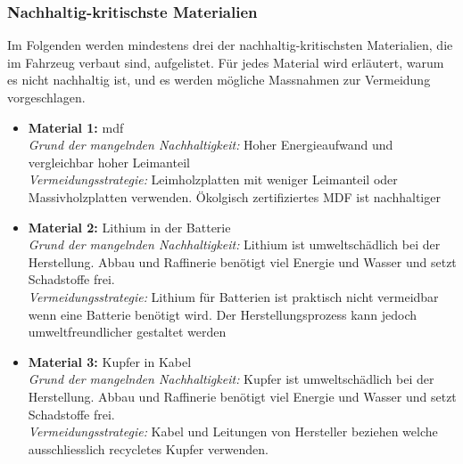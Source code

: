 \subsubsection{Nachhaltig-kritischste Materialien}
Im Folgenden werden mindestens drei der nachhaltig-kritischsten Materialien, die im Fahrzeug verbaut sind, aufgelistet. Für jedes Material wird erläutert, warum es nicht nachhaltig ist, und es werden mögliche Massnahmen zur Vermeidung vorgeschlagen.

\begin{itemize}
    \item \textbf{Material 1:} \acrfull{mdf} \\
          \textit{Grund der mangelnden Nachhaltigkeit:} Hoher Energieaufwand und vergleichbar hoher Leimanteil  \\
          \textit{Vermeidungsstrategie:} Leimholzplatten mit weniger Leimanteil oder Massivholzplatten verwenden. Ökolgisch zertifiziertes MDF ist nachhaltiger
          
    \item \textbf{Material 2:} Lithium in der Batterie \\
          \textit{Grund der mangelnden Nachhaltigkeit:} Lithium ist umweltschädlich bei der Herstellung. Abbau und Raffinerie benötigt viel Energie und Wasser und setzt Schadstoffe frei. \\
          \textit{Vermeidungsstrategie:} Lithium für Batterien ist praktisch nicht vermeidbar wenn eine Batterie benötigt wird. Der Herstellungsprozess kann jedoch umweltfreundlicher gestaltet werden
          
    \item \textbf{Material 3:} Kupfer in Kabel \\
          \textit{Grund der mangelnden Nachhaltigkeit:} Kupfer ist umweltschädlich bei der Herstellung. Abbau und Raffinerie benötigt viel Energie und Wasser und setzt Schadstoffe frei. \\
          \textit{Vermeidungsstrategie:} Kabel und Leitungen von Hersteller beziehen welche ausschliesslich recycletes Kupfer verwenden.
\end{itemize}

